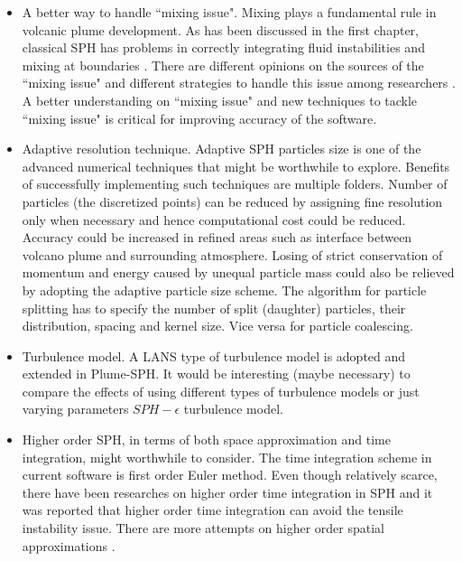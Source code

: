 \begin{itemize}
\item A better way to handle ``mixing issue". Mixing plays a fundamental rule in volcanic plume development. As has been discussed in the first chapter, classical SPH has problems in correctly integrating fluid instabilities and mixing at boundaries \citet{read2010resolving}. There are different opinions on the sources of the ``mixing issue" and different strategies to handle this issue among researchers \citep{chen1999improvement, ritchie2001multiphase, agertz2007fundamental, wadsley2008treatment, price2008modelling, read2010resolving, borgani2012hydrodynamic}. A better understanding on ``mixing issue" and new techniques to tackle ``mixing issue" is critical for improving accuracy of the software.
\item Adaptive resolution technique. Adaptive SPH particles size \citep{lopez2013dynamic, vacondio2016variable} is one of the advanced numerical techniques that might be worthwhile to explore. Benefits of successfully implementing such techniques are multiple folders. Number of particles (the discretized points) can be reduced by assigning fine resolution only when necessary and hence computational cost could be reduced. Accuracy could be increased in refined areas such as interface between volcano plume and surrounding atmosphere. Losing of strict conservation of momentum and energy caused by unequal particle mass could also be relieved by adopting the adaptive particle size scheme. The algorithm for particle splitting has to specify the number of split (daughter) particles, their distribution, spacing and kernel size. Vice versa for particle coalescing.
\item Turbulence model. A LANS type of turbulence model is adopted and extended in Plume-SPH. It would be interesting (maybe necessary) to compare the effects of using different types of turbulence models or just varying parameters $SPH-\epsilon$ turbulence model.
\item Higher order SPH, in terms of both space approximation and time integration, might worthwhile to consider. The time integration scheme in current software is first order Euler method. Even though relatively scarce, there have been researches \citep{blanc2012stabilized} on higher order time integration in SPH and it was reported that higher order time integration can avoid the tensile instability issue. There are more attempts on higher order spatial approximations \citep{bonet1999variational, dilts1999moving, leonardi2014explicit, lind2016high}.

\end{itemize}
